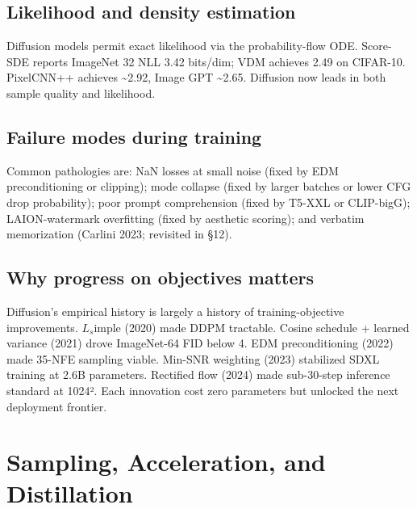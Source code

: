 \subsection{Likelihood and density estimation}\label{likelihood-and-density-estimation}

Diffusion models permit exact likelihood via the probability-flow ODE. Score-SDE reports ImageNet 32 NLL 3.42 bits/dim; VDM achieves 2.49 on CIFAR-10. PixelCNN++ achieves \textasciitilde2.92, Image GPT \textasciitilde2.65. Diffusion now leads in both sample quality and likelihood.

\subsection{Failure modes during training}\label{failure-modes-during-training}

Common pathologies are: NaN losses at small noise (fixed by EDM preconditioning or clipping); mode collapse (fixed by larger batches or lower CFG drop probability); poor prompt comprehension (fixed by T5-XXL or CLIP-bigG); LAION-watermark overfitting (fixed by aesthetic scoring); and verbatim memorization (Carlini 2023; revisited in §12).

\subsection{Why progress on objectives matters}\label{why-progress-on-objectives-matters}

Diffusion's empirical history is largely a history of training-objective improvements. \(L_s\)imple (2020) made DDPM tractable. Cosine schedule + learned variance (2021) drove ImageNet-64 FID below 4. EDM preconditioning (2022) made 35-NFE sampling viable. Min-SNR weighting (2023) stabilized SDXL training at 2.6B parameters. Rectified flow (2024) made sub-30-step inference standard at 1024². Each innovation cost zero parameters but unlocked the next deployment frontier.

\section{Sampling, Acceleration, and Distillation}\label{sampling-acceleration-and-distillation}

